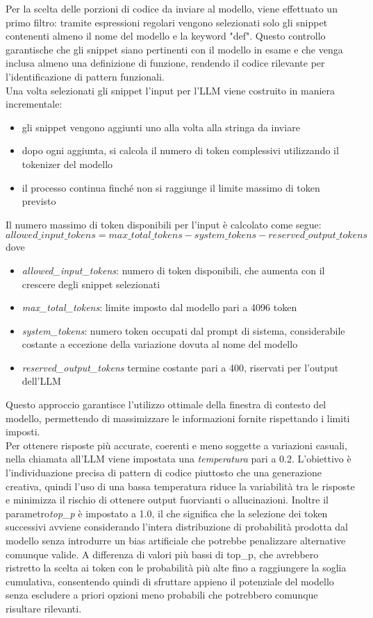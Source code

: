 \documentclass{article}
\begin{document}
Per la scelta delle porzioni di codice da inviare al modello, viene effettuato un primo filtro: tramite espressioni regolari vengono selezionati solo gli snippet contenenti almeno il nome del modello e la keyword "def". Questo controllo garantische che gli snippet siano pertinenti con il modello in esame e che venga inclusa almeno una definizione di funzione, rendendo il codice rilevante per l'identificazione di pattern funzionali.\\
Una volta selezionati gli snippet l'input per l'LLM viene costruito in maniera incrementale:
\begin{itemize}
    \item gli snippet vengono aggiunti uno alla volta alla stringa da inviare
    \item dopo ogni aggiunta, si calcola il numero di token complessivi utilizzando il tokenizer del modello
    \item il processo continua finché non si raggiunge il limite massimo di token previsto
\end{itemize}
Il numero massimo di token disponibili per l’input è calcolato come segue:
\begin{equation}
    allowed\_input\_tokens = max\_total\_tokens - system\_tokens - reserved\_output\_tokens
\end{equation}
dove
\begin{itemize}
    \item \textit{allowed\_input\_tokens}: numero di token disponibili, che aumenta con il crescere degli snippet selezionati
    \item \textit{max\_total\_tokens}: limite imposto dal modello pari a 4096 token
    \item \textit{system\_tokens}: numero token occupati dal prompt di sistema, considerabile costante a eccezione della variazione dovuta al nome del modello
    \item \textit{reserved\_output\_tokens} termine costante pari a 400,  riservati per l’output dell’LLM
\end{itemize}
Questo approccio garantisce l'utilizzo ottimale della finestra di contesto del modello, permettendo di massimizzare le informazioni fornite rispettando i limiti imposti.\\
Per ottenere risposte più accurate, coerenti e meno soggette a variazioni casuali, nella chiamata all'LLM viene impostata una \textit{temperatura} pari a 0.2. L'obiettivo è l’individuazione precisa di pattern di codice piuttosto che una generazione creativa, quindi l'uso di una bassa temperatura riduce la variabilità tra le risposte e minimizza il rischio di ottenere output fuorvianti o allucinazioni. Inoltre il parametro\textit{top\_p} è impostato a 1.0, il che significa che la selezione dei token successivi avviene considerando l'intera distribuzione di probabilità prodotta dal modello senza introdurre un bias artificiale che potrebbe penalizzare alternative comunque valide. A differenza di valori più bassi di top\_p, che avrebbero ristretto la scelta ai token con le probabilità più alte fino a raggiungere la soglia cumulativa, consentendo quindi di sfruttare appieno il potenziale del modello senza escludere a priori opzioni meno probabili che potrebbero comunque risultare rilevanti.\\
\end{document}
